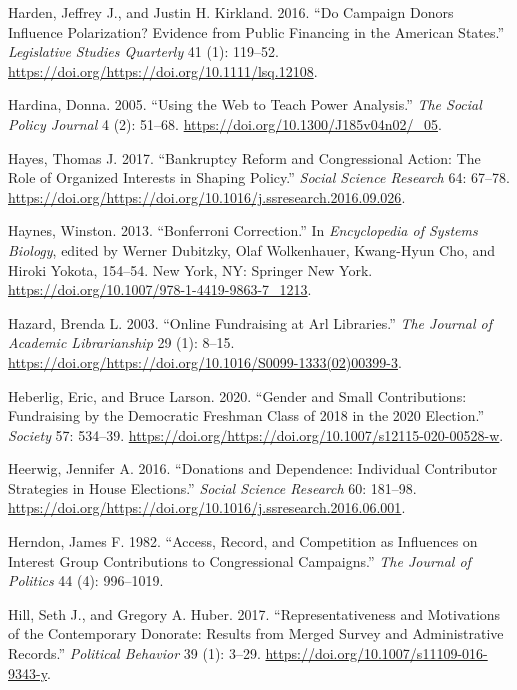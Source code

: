 \documentclass[12pt,]{article}
\begin{document}
\leavevmode\hypertarget{ref-harden2016}{}%
Harden, Jeffrey J., and Justin H. Kirkland. 2016. ``Do Campaign Donors
Influence Polarization? Evidence from Public Financing in the American
States.'' \emph{Legislative Studies Quarterly} 41 (1): 119--52.
\url{https://doi.org/https://doi.org/10.1111/lsq.12108}.

\leavevmode\hypertarget{ref-hardina2005}{}%
Hardina, Donna. 2005. ``Using the Web to Teach Power Analysis.''
\emph{The Social Policy Journal} 4 (2): 51--68.
\url{https://doi.org/10.1300/J185v04n02/_05}.

\leavevmode\hypertarget{ref-hayes2017}{}%
Hayes, Thomas J. 2017. ``Bankruptcy Reform and Congressional Action: The
Role of Organized Interests in Shaping Policy.'' \emph{Social Science
Research} 64: 67--78.
\url{https://doi.org/https://doi.org/10.1016/j.ssresearch.2016.09.026}.

\leavevmode\hypertarget{ref-bonferroni}{}%
Haynes, Winston. 2013. ``Bonferroni Correction.'' In \emph{Encyclopedia
of Systems Biology}, edited by Werner Dubitzky, Olaf Wolkenhauer,
Kwang-Hyun Cho, and Hiroki Yokota, 154--54. New York, NY: Springer New
York. \url{https://doi.org/10.1007/978-1-4419-9863-7_1213}.

\leavevmode\hypertarget{ref-hazard2003}{}%
Hazard, Brenda L. 2003. ``Online Fundraising at Arl Libraries.''
\emph{The Journal of Academic Librarianship} 29 (1): 8--15.
\url{https://doi.org/https://doi.org/10.1016/S0099-1333(02)00399-3}.

\leavevmode\hypertarget{ref-heberlig2020}{}%
Heberlig, Eric, and Bruce Larson. 2020. ``Gender and Small
Contributions: Fundraising by the Democratic Freshman Class of 2018 in
the 2020 Election.'' \emph{Society} 57: 534--39.
\url{https://doi.org/https://doi.org/10.1007/s12115-020-00528-w}.

\leavevmode\hypertarget{ref-heerwig2016}{}%
Heerwig, Jennifer A. 2016. ``Donations and Dependence: Individual
Contributor Strategies in House Elections.'' \emph{Social Science
Research} 60: 181--98.
\url{https://doi.org/https://doi.org/10.1016/j.ssresearch.2016.06.001}.

\leavevmode\hypertarget{ref-herndon1982}{}%
Herndon, James F. 1982. ``Access, Record, and Competition as Influences
on Interest Group Contributions to Congressional Campaigns.'' \emph{The
Journal of Politics} 44 (4): 996--1019.

\leavevmode\hypertarget{ref-hill2017}{}%
Hill, Seth J., and Gregory A. Huber. 2017. ``Representativeness and
Motivations of the Contemporary Donorate: Results from Merged Survey and
Administrative Records.'' \emph{Political Behavior} 39 (1): 3--29.
\url{https://doi.org/10.1007/s11109-016-9343-y}.
\end{document}
